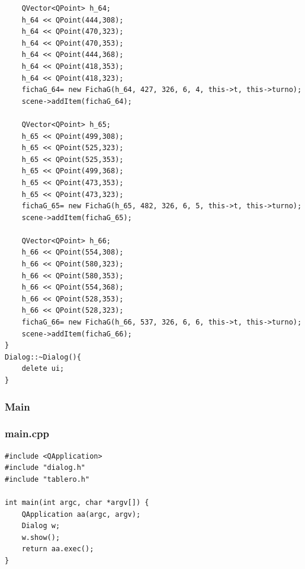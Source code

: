 \documentclass[12pt,letterpaper]{article}
\begin{document}
\begin{lstlisting}
    QVector<QPoint> h_64;
    h_64 << QPoint(444,308);
    h_64 << QPoint(470,323);
    h_64 << QPoint(470,353);
    h_64 << QPoint(444,368);
    h_64 << QPoint(418,353);
    h_64 << QPoint(418,323);
    fichaG_64= new FichaG(h_64, 427, 326, 6, 4, this->t, this->turno);
    scene->addItem(fichaG_64);

    QVector<QPoint> h_65;
    h_65 << QPoint(499,308);
    h_65 << QPoint(525,323);
    h_65 << QPoint(525,353);
    h_65 << QPoint(499,368);
    h_65 << QPoint(473,353);
    h_65 << QPoint(473,323);
    fichaG_65= new FichaG(h_65, 482, 326, 6, 5, this->t, this->turno);
    scene->addItem(fichaG_65);

    QVector<QPoint> h_66;
    h_66 << QPoint(554,308);
    h_66 << QPoint(580,323);
    h_66 << QPoint(580,353);
    h_66 << QPoint(554,368);
    h_66 << QPoint(528,353);
    h_66 << QPoint(528,323);
    fichaG_66= new FichaG(h_66, 537, 326, 6, 6, this->t, this->turno);
    scene->addItem(fichaG_66);
}
Dialog::~Dialog(){
    delete ui;
}
\end{lstlisting}

\subsubsection{Main}
\subsubsection*{main.cpp}
\begin{lstlisting}
#include <QApplication>
#include "dialog.h"
#include "tablero.h"

int main(int argc, char *argv[]) {
    QApplication aa(argc, argv);
    Dialog w;
    w.show();
    return aa.exec();
}
\end{lstlisting}
\end{document}
